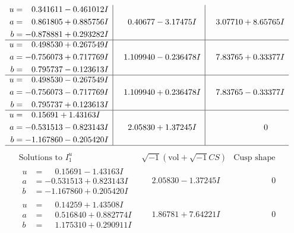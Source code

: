 \documentclass[1p]{elsarticle_modified}
\theoremstyle{definition}
\newcommand{\I}{\sqrt{-1}}
\begin{document}
$$\begin{array}{c|c|c}
\begin{aligned}
u &= \phantom{-}0.341611 - 0.461012 I \\
a &= \phantom{-}0.861805 + 0.885756 I \\
b &= -0.878881 + 0.293282 I\end{aligned}
 & \phantom{-}0.40677 - 3.17475 I & \phantom{-}3.07710 + 8.65765 I \\ \hline\begin{aligned}
u &= \phantom{-}0.498530 + 0.267549 I \\
a &= -0.756073 + 0.717769 I \\
b &= \phantom{-}0.795737 - 0.123613 I\end{aligned}
 & \phantom{-}1.109940 - 0.236478 I & \phantom{-}7.83765 + 0.33377 I \\ \hline\begin{aligned}
u &= \phantom{-}0.498530 - 0.267549 I \\
a &= -0.756073 - 0.717769 I \\
b &= \phantom{-}0.795737 + 0.123613 I\end{aligned}
 & \phantom{-}1.109940 + 0.236478 I & \phantom{-}7.83765 - 0.33377 I \\ \hline\begin{aligned}
u &= \phantom{-}0.15691 + 1.43163 I \\
a &= -0.531513 - 0.823143 I \\
b &= -1.167860 - 0.205420 I\end{aligned}
 & \phantom{-}2.05830 + 1.37245 I & \phantom{-0.000000 } 0\\
 \hline 
 \end{array}$$\newpage$$\begin{array}{c|c|c}  
\text{Solutions to }I^u_{1}& \I (\text{vol} + \sqrt{-1}CS) & \text{Cusp shape}\\
 \hline 
\begin{aligned}
u &= \phantom{-}0.15691 - 1.43163 I \\
a &= -0.531513 + 0.823143 I \\
b &= -1.167860 + 0.205420 I\end{aligned}
 & \phantom{-}2.05830 - 1.37245 I & \phantom{-0.000000 } 0 \\ \hline\begin{aligned}
u &= \phantom{-}0.14259 + 1.43508 I \\
a &= \phantom{-}0.516840 + 0.882774 I \\
b &= \phantom{-}1.175310 + 0.290911 I\end{aligned}
 & \phantom{-}1.86781 + 7.64221 I & \phantom{-0.000000 } 0 \\ \hline\begin{aligned}

\end{aligned}
\end{array}$$
\end{document}
